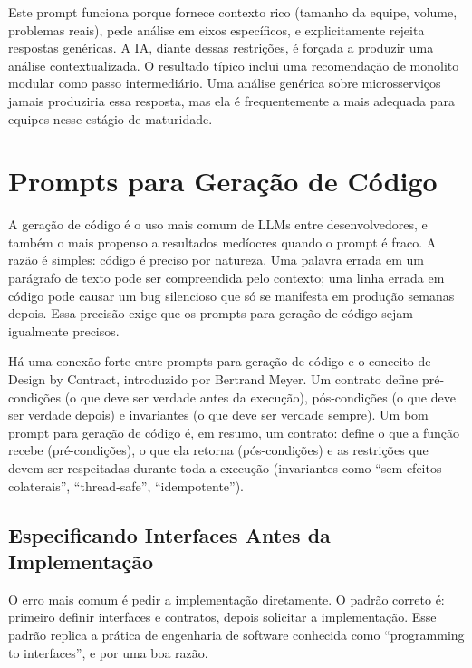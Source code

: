 Este prompt funciona porque fornece contexto rico (tamanho da equipe, volume,
problemas reais), pede análise em eixos específicos, e explicitamente rejeita
respostas genéricas. A IA, diante dessas restrições, é forçada a produzir uma
análise contextualizada. O resultado típico inclui uma recomendação de monolito
modular como passo intermediário. Uma análise genérica sobre
microsserviços jamais produziria essa resposta, mas ela é frequentemente a mais adequada para
equipes nesse estágio de maturidade.

\section{Prompts para Geração de Código}

A geração de código é o uso mais comum de LLMs entre desenvolvedores, e
também o mais propenso a resultados medíocres quando o prompt é fraco. A razão
é simples: código é preciso por natureza. Uma palavra errada em um parágrafo de
texto pode ser compreendida pelo contexto; uma linha errada em código pode
causar um bug silencioso que só se manifesta em produção semanas depois. Essa
precisão exige que os prompts para geração de código sejam igualmente precisos.

Há uma conexão forte entre prompts para geração de código e o conceito de
Design by Contract, introduzido por Bertrand Meyer. Um contrato define
pré-condições (o que deve ser verdade antes da execução), pós-condições (o que
deve ser verdade depois) e invariantes (o que deve ser verdade sempre). Um bom
prompt para geração de código é, em resumo, um contrato: define o que a
função recebe (pré-condições), o que ela retorna (pós-condições) e as restrições
que devem ser respeitadas durante toda a execução (invariantes como ``sem efeitos
colaterais'', ``thread-safe'', ``idempotente'').

\subsection{Especificando Interfaces Antes da Implementação}

O erro mais comum é pedir a implementação diretamente. O padrão correto é:
primeiro definir interfaces e contratos, depois solicitar a implementação. Esse
padrão replica a prática de engenharia de software conhecida como ``programming
to interfaces'', e por uma boa razão.

